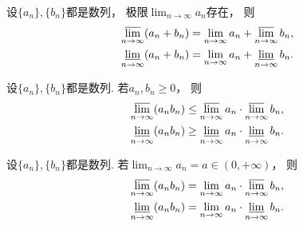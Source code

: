 \begin{example}
设\(\{a_n\},\{b_n\}\)都是数列，
极限\(\lim_{n\to\infty} a_n\)存在，
则\begin{gather*}
	\varlimsup_{n\to\infty} (a_n + b_n)
	= \lim_{n\to\infty} a_n + \varlimsup_{n\to\infty} b_n, \\
	\varliminf_{n\to\infty} (a_n + b_n)
	= \lim_{n\to\infty} a_n + \varliminf_{n\to\infty} b_n.
\end{gather*}
\end{example}

\begin{example}
设\(\{a_n\},\{b_n\}\)都是数列.
若\(a_n,b_n\geq0\)，
则\begin{gather*}
	\varlimsup_{n\to\infty} (a_n b_n)
	\leq \varlimsup_{n\to\infty} a_n \cdot \varlimsup_{n\to\infty} b_n, \\
	\varliminf_{n\to\infty} (a_n b_n)
	\geq \varliminf_{n\to\infty} a_n \cdot \varliminf_{n\to\infty} b_n.
\end{gather*}
\end{example}

\begin{example}
设\(\{a_n\},\{b_n\}\)都是数列.
若\(\lim_{n\to\infty} a_n = a \in (0,+\infty)\)，
则\begin{gather*}
	\varlimsup_{n\to\infty} (a_n b_n)
	= \lim_{n\to\infty} a_n \cdot \varlimsup_{n\to\infty} b_n, \\
	\varliminf_{n\to\infty} (a_n b_n)
	= \lim_{n\to\infty} a_n \cdot \varliminf_{n\to\infty} b_n.
\end{gather*}
\end{example}

